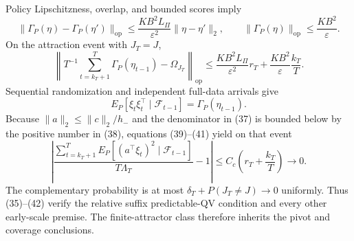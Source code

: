 Policy Lipschitzness, overlap, and bounded scores imply
\[
 \|\Gamma_P(\eta)-\Gamma_P(\eta')\|_{\mathrm{op}}
 \le\frac{KB^2L_\Pi}{\varepsilon^2}\|\eta-\eta'\|_2,
 \qquad \|\Gamma_P(\eta)\|_{\mathrm{op}}\le\frac{KB^2}{\varepsilon}.
\tag{39}
\]
On the attraction event with \(J_T=J\),
\[
 \left\|T^{-1}\sum_{t=k_T+1}^T\Gamma_P(\eta_{t-1})-\Omega_{J_T}
 \right\|_{\mathrm{op}}
 \le\frac{KB^2L_\Pi}{\varepsilon^2}r_T
 +\frac{KB^2}{\varepsilon}\frac{k_T}{T}.
\tag{40}
\]
Sequential randomization and independent full-data arrivals give
\[
 E_P[\xi_t\xi_t^\top\mid\mathcal F_{t-1}]
 =\Gamma_P(\eta_{t-1}).
\tag{41}
\]
Because \(\|a\|_2\le\|c\|_2/h_-\) and the denominator in (37) is bounded
below by the positive number in (38), equations (39)--(41) yield on that
event
\[
 \left|
 \frac{\sum_{t=k_T+1}^TE_P[(a^\top\xi_t)^2\mid\mathcal F_{t-1}]}
 {T\Lambda_T}-1\right|
 \le C_c\left(r_T+\frac{k_T}{T}\right)\longrightarrow0.
\tag{42}
\]
The complementary probability is at most
\(\delta_T+P(J_T\ne J)\to0\) uniformly.  Thus (35)--(42) verify the relative
suffix predictable-QV condition and every other early-scale premise.  The
finite-attractor class therefore inherits the pivot and coverage conclusions.
